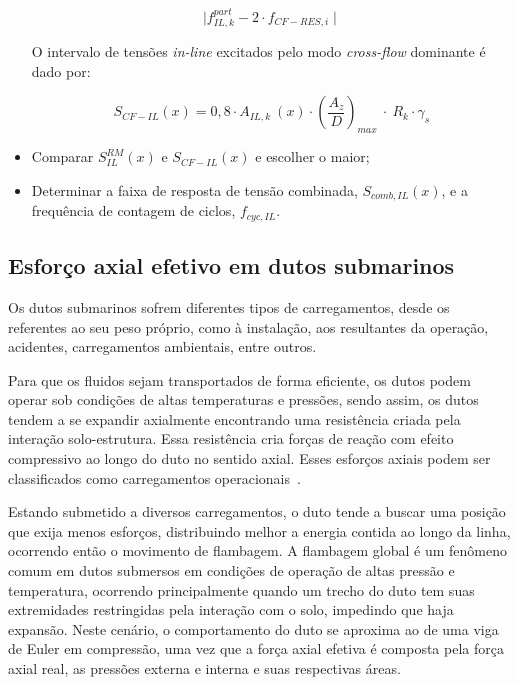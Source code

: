 \begin{itemize}
\[\mid f_{\mathit{IL}, \mathit{k}}^\mathit{part} - 2 \cdot f_{\mathit{CF-RES}, \mathit{i}} \mid\]
		
O intervalo de tensões \textit{in-line} excitados pelo modo \textit{cross-flow} dominante é dado por:

		\[S_{\mathit{CF}-\mathit{IL}}(x) = 0,8 \cdot A_{\mathit{IL}, \mathit{k}}~(x) \cdot \left(\frac{A_{z}}{D}\right)_\mathit{max}~\cdot~R_k \cdot \gamma_s\]

\item Comparar $S_\mathit{IL}^\mathit{RM}(x)$ e $S_{\mathit{CF}-\mathit{IL}}(x)$ e escolher o maior;
\item Determinar a faixa de resposta de tensão combinada, $S_{\mathit{comb}, \mathit{IL}}(x)$, e a frequência de contagem de ciclos, $f_{\mathit{cyc}, \mathit{IL}}$.
\end{itemize}


\subsection{Esforço axial efetivo em dutos submarinos}

Os dutos submarinos sofrem diferentes tipos de carregamentos, desde os referentes ao seu peso próprio, como à instalação, aos resultantes da operação, acidentes, carregamentos ambientais, entre outros. 

Para que os fluidos sejam transportados de forma eficiente, os dutos podem operar sob condições de altas temperaturas e pressões, sendo assim, os dutos tendem a se expandir axialmente encontrando uma resistência criada pela interação solo-estrutura. Essa resistência cria forças de reação com efeito compressivo ao longo do duto no sentido axial. Esses esforços axiais podem ser classificados como carregamentos operacionais~\cite{Pereira2016}.

Estando submetido a diversos carregamentos, o duto tende a buscar uma posição que exija menos esforços, distribuindo melhor a energia contida ao longo da linha, ocorrendo então o movimento de flambagem. A flambagem global é um fenômeno comum em dutos submersos em condições de operação de altas pressão e temperatura, ocorrendo principalmente quando um trecho do duto tem suas extremidades restringidas pela interação com o solo, impedindo que haja expansão. Neste cenário, o comportamento do duto se aproxima ao de uma viga de Euler em compressão, uma vez que a força axial efetiva é composta pela força axial real, as pressões externa e interna e suas respectivas áreas.

